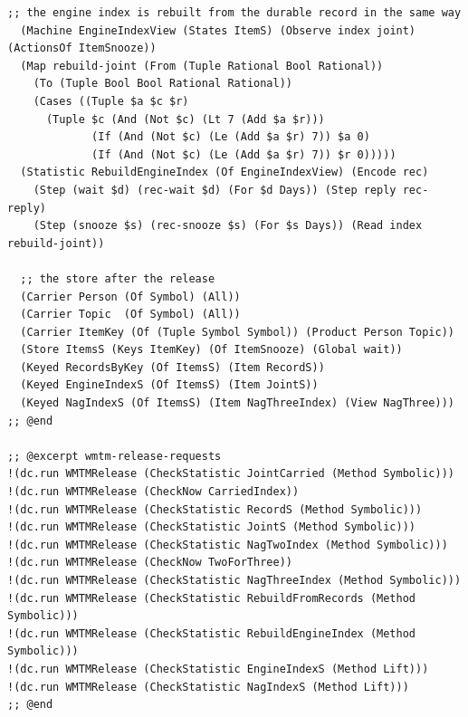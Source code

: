 \documentclass[11pt]{article}
\theoremstyle{definition}
\theoremstyle{plain}
\begin{document}
\begin{lstlisting}[style=mettafull]
  ;; the engine index is rebuilt from the durable record in the same way
  (Machine EngineIndexView (States ItemS) (Observe index joint) (ActionsOf ItemSnooze))
  (Map rebuild-joint (From (Tuple Rational Bool Rational))
    (To (Tuple Bool Bool Rational Rational))
    (Cases ((Tuple $a $c $r)
      (Tuple $c (And (Not $c) (Lt 7 (Add $a $r)))
             (If (And (Not $c) (Le (Add $a $r) 7)) $a 0)
             (If (And (Not $c) (Le (Add $a $r) 7)) $r 0)))))
  (Statistic RebuildEngineIndex (Of EngineIndexView) (Encode rec)
    (Step (wait $d) (rec-wait $d) (For $d Days)) (Step reply rec-reply)
    (Step (snooze $s) (rec-snooze $s) (For $s Days)) (Read index rebuild-joint))

  ;; the store after the release
  (Carrier Person (Of Symbol) (All))
  (Carrier Topic  (Of Symbol) (All))
  (Carrier ItemKey (Of (Tuple Symbol Symbol)) (Product Person Topic))
  (Store ItemsS (Keys ItemKey) (Of ItemSnooze) (Global wait))
  (Keyed RecordsByKey (Of ItemsS) (Item RecordS))
  (Keyed EngineIndexS (Of ItemsS) (Item JointS))
  (Keyed NagIndexS (Of ItemsS) (Item NagThreeIndex) (View NagThree)))
;; @end

;; @excerpt wmtm-release-requests
!(dc.run WMTMRelease (CheckStatistic JointCarried (Method Symbolic)))
!(dc.run WMTMRelease (CheckNow CarriedIndex))
!(dc.run WMTMRelease (CheckStatistic RecordS (Method Symbolic)))
!(dc.run WMTMRelease (CheckStatistic JointS (Method Symbolic)))
!(dc.run WMTMRelease (CheckStatistic NagTwoIndex (Method Symbolic)))
!(dc.run WMTMRelease (CheckNow TwoForThree))
!(dc.run WMTMRelease (CheckStatistic NagThreeIndex (Method Symbolic)))
!(dc.run WMTMRelease (CheckStatistic RebuildFromRecords (Method Symbolic)))
!(dc.run WMTMRelease (CheckStatistic RebuildEngineIndex (Method Symbolic)))
!(dc.run WMTMRelease (CheckStatistic EngineIndexS (Method Lift)))
!(dc.run WMTMRelease (CheckStatistic NagIndexS (Method Lift)))
;; @end


\end{lstlisting}
\end{document}
